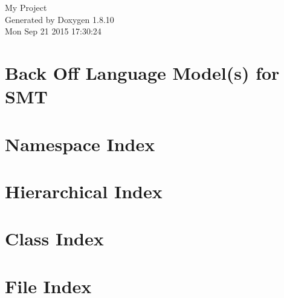 \documentclass[twoside]{book}
\newcommand{\+}{\discretionary{\mbox{\scriptsize$\hookleftarrow$}}{}{}}
\newcommand{\clearemptydoublepage}{%
  \newpage{\pagestyle{empty}\cleardoublepage}%
}
\begin{document}
\hypersetup{pageanchor=false,
             bookmarks=true,
             bookmarksnumbered=true,
             pdfencoding=unicode
            }
\begin{titlepage}
\vspace*{7cm}
\begin{center}%
{\Large My Project }\\
\vspace*{1cm}
{\large Generated by Doxygen 1.8.10}\\
\vspace*{0.5cm}
{\small Mon Sep 21 2015 17:30:24}\\
\end{center}
\end{titlepage}
\clearemptydoublepage
\tableofcontents
\clearemptydoublepage
{}
\hypersetup{pageanchor=true}

\chapter{Back Off Language Model(s) for S\+M\+T}
\label{md__r_e_a_d_m_e}
\hypertarget{md__r_e_a_d_m_e}{}

\chapter{Namespace Index}

\chapter{Hierarchical Index}

\chapter{Class Index}

\chapter{File Index}

\end{document}
